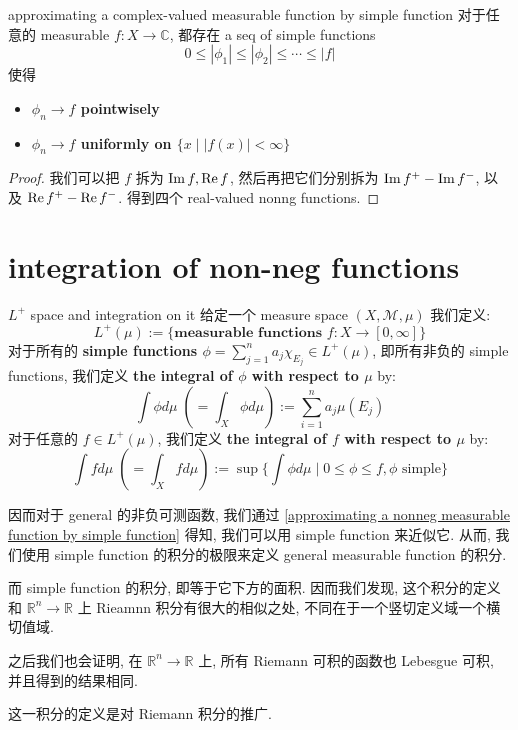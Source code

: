 \documentclass[lang=cn,11pt]{elegantbook}
\begin{document}
\begin{corollary}{approximating a complex-valued measurable function by simple function}
对于任意的 measurable $f:X\rightarrow \mathbb{C}$, 都存在 a seq of simple functions $$0 \leq |\phi_1| \leq |\phi_2| \leq \cdots \leq |f|$$ 使得 
\begin{itemize}
    \item \textbf{$\phi_n \rightarrow f$ pointwisely}
    \item \textbf{$\phi_n \rightarrow f$ uniformly on $\{ x \mid |f(x)| < \infty\}$}
\end{itemize}
\end{corollary}

\begin{proof}
    我们可以把 $f$ 拆为 $\operatorname{Im} f, \operatorname{Re} f$, 然后再把它们分别拆为 $\operatorname{Im} f^+ - \operatorname{Im} f^-$, 以及 $\operatorname{Re} f^+ - \operatorname{Re} f^-$. 得到四个 real-valued nonng functions.
\end{proof}




\section{integration of non-neg functions}

\begin{definition}{$L^+$ space and integration on it}
给定一个 measure space $(X, \mathcal{M},\mu)$
    我们定义: $$
    L^+(\mu)  := \{  \textbf{measurable functions }  f: X \rightarrow [0,\infty]   \} $$
对于所有的 \textbf{simple functions $\phi = \sum_{j=1}^n a_j \chi_{E_j} \in L^+(\mu)$}, 即所有非负的 simple functions, 我们定义\textbf{ the integral of $\phi$ with respect to $\mu$} by:
$$\int \phi d \mu  \;(= \int_X   \phi d\mu  ) := \sum_{i=1}^n a_j \mu(E_j)$$
对于任意的 $f \in L^+(\mu)$, 我们定义 \textbf{the integral of $f$ with respect to $\mu$ }by: 
$$ \int f d \mu \;(= \int_X  fd\mu ) := \sup \{   \int \phi d\mu \mid 0\leq \phi \leq f, \phi  \text{ simple} \}$$
\end{definition}

\begin{remark}
因而对于 general 的非负可测函数, 我们通过 \ref{approximating a nonneg measurable function by simple function} 得知, 我们可以用 simple function 来近似它. 从而, 我们使用 simple function 的积分的极限来定义 general measurable function 的积分.

而 simple function 的积分, 即等于它下方的面积. 因而我们发现, 这个积分的定义和 $\mathbb{R}^n \rightarrow \mathbb{R}$ 上 Rieamnn 积分有很大的相似之处, 不同在于一个竖切定义域一个横切值域.

之后我们也会证明, 在 $\mathbb{R}^n \rightarrow \mathbb{R}$ 上, 所有 Riemann 可积的函数也 Lebesgue 可积, 并且得到的结果相同.

这一积分的定义是对 Riemann 积分的推广.
\end{remark}
\end{document}
